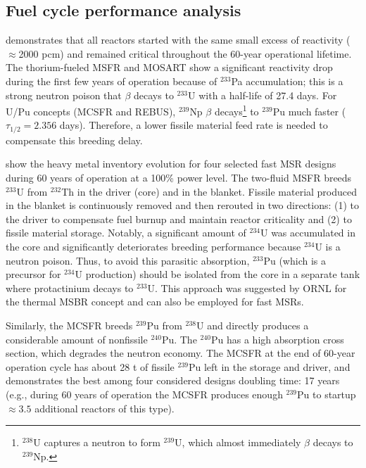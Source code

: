 \documentclass[letterpaper]{mandc2019}
\begin{document}
\subsection{Fuel cycle performance analysis}
\label{sec:performance}
 demonstrates that all reactors started with the same small excess of reactivity ($\approx$2000 pcm) and remained critical throughout the 60-year operational lifetime. 
The thorium-fueled \gls{MSFR} and \gls{MOSART} show a significant reactivity drop during the first few years of operation because of $^{233}$Pa accumulation; this is a strong neutron poison that $\beta$ decays to $^{233}$U with a half-life of 27.4 days. 
For U/Pu concepts (\gls{MCSFR} and REBUS), $^{239}$Np $\beta$ decays\footnote{$^{238}$U captures a neutron to form $^{239}$U, which almost immediately $\beta$ decays to $^{239}$Np.} to $^{239}$Pu much faster ($\tau_{1/2}=2.356$ days). 
Therefore, a lower fissile material feed rate is needed to compensate this breeding delay.

 show the heavy metal inventory evolution for four selected fast \gls{MSR} designs during 60 years of operation at a 100\% power level. 
The two-fluid \gls{MSFR} breeds $^{233}$U from $^{232}$Th in the driver (core) and in the blanket. Fissile material produced in the blanket is continuously removed and then rerouted in two directions: (1) to the driver to compensate fuel burnup and maintain reactor criticality and (2) to fissile material storage. 
Notably, a significant amount of $^{234}$U was accumulated in the core and significantly deteriorates breeding performance because $^{234}$U is a neutron poison. 
Thus, to avoid this parasitic absorption, $^{233}$Pu (which is a precursor for $^{234}$U production) should be isolated from the core in a separate tank where protactinium decays to $^{233}$U. 
This approach was suggested by \gls{ORNL} for the thermal \gls{MSBR} concept \cite{robertson_conceptual_1971} and can also be employed for fast \gls{MSR}s.

Similarly, the \gls{MCSFR} breeds $^{239}$Pu from $^{238}$U and directly produces a considerable amount of nonfissile $^{240}$Pu. 
The $^{240}$Pu has a high absorption cross section, which degrades the neutron economy. 
The \gls{MCSFR} at the end of 60-year operation cycle has about 28 t of fissile $^{239}$Pu left in the storage and driver, and demonstrates the best among four considered designs doubling time: 17 years (e.g., during 60 years of operation the \gls{MCSFR} produces enough $^{239}$Pu to startup $\approx3.5$ additional reactors of this type).
\end{document}

